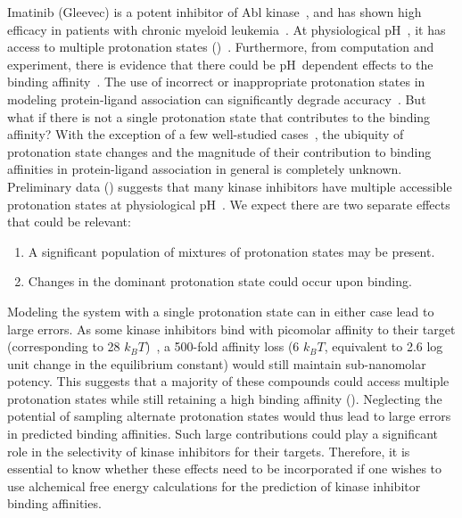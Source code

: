 \documentclass[10pt,final]{article}
\newcommand{\pH}{p$\mathrm{H}$\ }
\begin{document}
Imatinib (Gleevec) is a potent inhibitor of Abl kinase~\autocite{Druker2001a}, and has shown high efficacy in patients with chronic myeloid leukemia~\autocite{OBrien2003a}.
%
At physiological \pH, it has access to multiple protonation states ()~\autocite{Szakacs2005a}.
%
Furthermore, from computation and experiment, there is evidence that there could be \pH dependent effects to the binding affinity~\autocite{Seeliger2007a,Lin2013a}.
%
The use of incorrect or inappropriate protonation states in modeling protein-ligand association can significantly degrade accuracy~\autocite{Polgar2005a,Wittayanarakul2008a}.
%
But what if there is not a single protonation state that contributes to the binding affinity?
%
With the exception of a few well-studied cases~\autocite{Dullweber2001a,Aleksandrov2007a,Czodrowski2007a,Steuber2007a,Czodrowski2007b}, 
the ubiquity of protonation state changes and the magnitude of their contribution to binding affinities in protein-ligand association in general is completely unknown. 
%
Preliminary data () suggests that many kinase inhibitors have multiple accessible protonation states at physiological \pH.
%
We expect there are two separate effects that could be relevant:
\begin{enumerate}
 \item A significant population of mixtures of protonation states may be present.
 \item Changes in the dominant protonation state could occur upon binding.
\end{enumerate}
%
Modeling the system with a single protonation state can in either case lead to large errors.
%
As some kinase inhibitors bind with picomolar affinity to their target (corresponding to 28 $k_BT$)~\autocite{Knight2005a}, a 500-fold affinity loss (6 $k_BT$, equivalent to 2.6 log unit change in the equilibrium constant) would still maintain sub-nanomolar potency.
%
This suggests that a majority of these compounds could access multiple protonation states while still retaining a high binding affinity ().
%
Neglecting the potential of sampling alternate protonation states would thus lead to large errors in predicted binding affinities.
%
Such large contributions could play a significant role in the selectivity of kinase inhibitors for their targets.
%
Therefore, it is essential to know whether these effects need to be incorporated if one wishes to use alchemical free energy calculations for the prediction of kinase inhibitor binding affinities.
\end{document}
